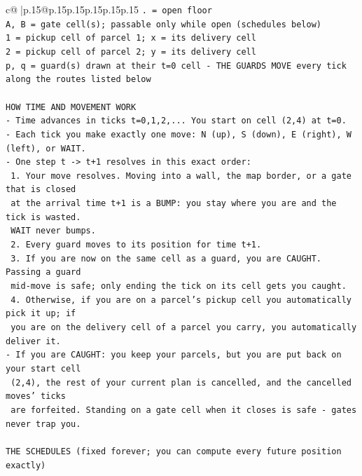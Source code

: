\documentclass{article}
\begin{document}
{\begin{supertabular}{c@{$\;$}|p{.15\linewidth}@{}p{.15\linewidth}p{.15\linewidth}p{.15\linewidth}p{.15\linewidth}p{.15\linewidth}}
{{{\texttt{. = open floor} \\
\texttt{A, B = gate cell(s); passable only while open (schedules below)} \\
\texttt{1 = pickup cell of parcel 1; x = its delivery cell} \\
\texttt{2 = pickup cell of parcel 2; y = its delivery cell} \\
\texttt{p, q = guard(s) drawn at their t=0 cell {-} THE GUARDS MOVE every tick along the routes listed below} \\
\\ 
\texttt{HOW TIME AND MOVEMENT WORK} \\
\texttt{{-} Time advances in ticks t=0,1,2,... You start on cell (2,4) at t=0.} \\
\texttt{{-} Each tick you make exactly one move: N (up), S (down), E (right), W (left), or WAIT.} \\
\texttt{{-} One step t {-}> t+1 resolves in this exact order:} \\
\texttt{  1. Your move resolves. Moving into a wall, the map border, or a gate that is closed} \\
\texttt{     at the arrival time t+1 is a BUMP: you stay where you are and the tick is wasted.} \\
\texttt{     WAIT never bumps.} \\
\texttt{  2. Every guard moves to its position for time t+1.} \\
\texttt{  3. If you are now on the same cell as a guard, you are CAUGHT. Passing a guard} \\
\texttt{     mid{-}move is safe; only ending the tick on its cell gets you caught.} \\
\texttt{  4. Otherwise, if you are on a parcel's pickup cell you automatically pick it up; if} \\
\texttt{     you are on the delivery cell of a parcel you carry, you automatically deliver it.} \\
\texttt{{-} If you are CAUGHT: you keep your parcels, but you are put back on your start cell} \\
\texttt{  (2,4), the rest of your current plan is cancelled, and the cancelled moves' ticks} \\
\texttt{  are forfeited. Standing on a gate cell when it closes is safe {-} gates never trap you.} \\
\\ 
\texttt{THE SCHEDULES (fixed forever; you can compute every future position exactly)} \\
}}}
\end{supertabular}}
\end{document}

